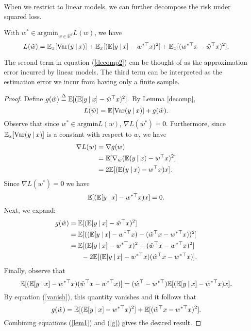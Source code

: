 When we restrict to linear models, we can further decompose the risk under squared loss.
\begin{lemma} \label{lin}
With $w^*\in \mathrm{argmin}_{w\in \mathbb{R}^d}L(w)$, we have \begin{equation}\label{decomp2}L(\hat{w}) = \mathbb{E}_x [\mathrm{Var}(y \: | \: x)] + \mathbb{E}_x[(\mathbb{E}[y\: | \: x]-w^{*\top} x)^2] + \mathbb{E}_x[(w^{*\top} x-\hat{w}^\top x)^2].\end{equation}
\end{lemma}
The second term in equation (\ref{decomp2}) can be thought of as the approximation error incurred by linear models. The third term can be interpreted as the estimation error we incur from having only a finite sample.
\begin{proof}
Define $g(\hat{w}) \defn \E[(\E[y\: | \: x]-\hat{w}^\top x)^2]$. By Lemma \ref{decomp}, \begin{equation}\label{lem1}L(\hat{w}) = \mathbb{E}[\mathrm{Var}(y\: | \: x)] + g(\hat{w}).\end{equation} Observe that since $w^*\in \mathrm{argmin} L(w)$, $\nabla L(w^*)=0$. Furthermore, since $\mathbb{E}_x[\mathrm{Var}(y\: | \: x)]$ is a constant with respect to $w$, we have
\begin{align*}
    \nabla L(w) &= \nabla g(w) \\
    &= \mathbb{E}[\nabla_w(\mathbb{E}(y\: | \: x) -w^\top x)^2] \\
    &= 2\mathbb{E}[(\mathbb{E}(y\: | \: x) - w^\top x)x].
\end{align*}
Since $\nabla L(w^*)=0$ we have \begin{equation}\label{vanish}\mathbb{E}[(\mathbb{E}[y \: | \: x]-w^{*\top}x)x]=0.\end{equation} Next, we expand:
\begin{align*}
    g(\hat{w}) &= \mathbb{E}[(\mathbb{E}[y\: | \: x]-\hat{w}^\top x)^2] \\
    &= \mathbb{E}[((\mathbb{E}[y\: | \:x]-w^{*\top}x)-(\hat{w}^\top x-w^{*\top}x))^2] \\
    &=\mathbb{E}[(\mathbb{E}[y\: | \: x] - w^{*\top}x)^2 + (\hat{w}^\top x - w^{*\top}x)^2] \\
    &\hspace{.25in} -2\mathbb{E}[(\mathbb{E}[y \: | \: x] - w^{*\top}x)(\hat{w}^\top x-w^{*\top}x)].
\end{align*}
Finally, observe that $$\mathbb{E}[(\mathbb{E}[y\: | \:x] - w^{*\top}x)(\hat{w}^\top x - w^{*\top}x)] = (\hat{w}^\top - w^{*\top})\mathbb{E}[(\mathbb{E}[y\:|\:x]-w^{*\top}x)x].$$ By equation (\ref{vanish}), this quantity vanishes and it follows that
\begin{equation}\label{g}g(\hat{w}) = \mathbb{E}[(\mathbb{E}[y\: | \: x] - w^{*\top}x)^2] + \mathbb{E}[(\hat{w}^\top x - w^{*\top}x)^2].\end{equation} Combining equations (\ref{lem1}) and (\ref{g}) gives the desired result. 
\end{proof}

